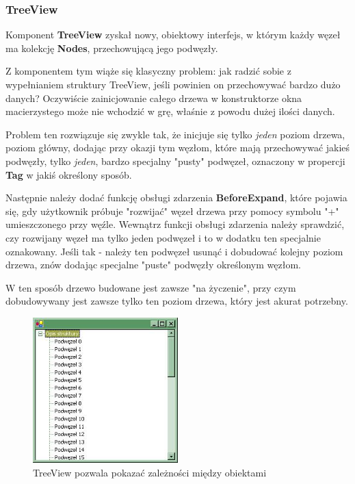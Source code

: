 \subsubsection{TreeView}

Komponent {\bf TreeView} zyskał nowy, obiektowy interfejs, w którym każdy węzeł ma kolekcję {\bf Nodes}, 
przechowującą jego podwęzły. 

Z komponentem tym wiąże się klasyczny problem: jak radzić sobie z wypełnianiem struktury TreeView, jeśli 
powinien on przechowywać bardzo dużo danych? Oczywiście zainicjowanie całego drzewa w konstruktorze
okna macierzystego może nie wchodzić w grę, właśnie z powodu dużej ilości danych.

Problem ten rozwiązuje się zwykle tak, że inicjuje się tylko {\em jeden} poziom drzewa, poziom główny,
dodając przy okazji tym węzłom, które mają przechowywać jakieś podwęzły, tylko {\em jeden}, bardzo specjalny
"pusty" podwęzeł, oznaczony w propercji {\bf Tag} w jakiś określony sposób.

Następnie należy dodać funkcję obsługi zdarzenia {\bf BeforeExpand}, które pojawia się, gdy użytkownik
próbuje "rozwijać" węzeł drzewa przy pomocy symbolu "+" umieszczonego przy węźle. Wewnątrz funkcji obsługi
zdarzenia należy sprawdzić, czy rozwijany węzeł ma tylko jeden podwęzeł i to w dodatku ten specjalnie oznakowany.
Jeśli tak - należy ten podwęzeł usunąć i dobudować kolejny poziom drzewa, znów dodając specjalne
"puste" podwęzły określonym węzłom.

W ten sposób drzewo budowane jest zawsze "na życzenie", przy czym dobudowywany jest zawsze tylko ten poziom
drzewa, który jest akurat potrzebny.

\begin{figure}
\begin{center}
\includegraphics[width=0.50\textwidth]{./pic/swf04}
\caption{TreeView pozwala pokazać zależności między obiektami}
\end{center}
\end{figure}

